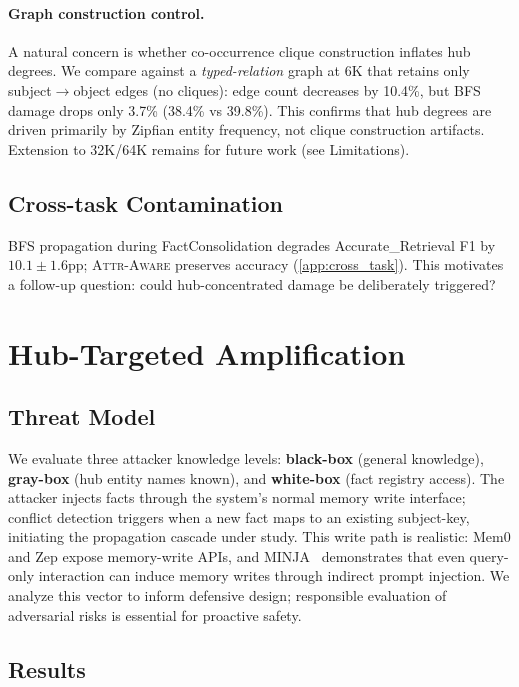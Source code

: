 \documentclass{article}
\newcommand{\attraware}{\textsc{Attr-Aware}}
\begin{document}
\paragraph{Graph construction control.}
A natural concern is whether co-occurrence clique construction inflates hub degrees.
We compare against a \textit{typed-relation} graph at 6K that retains only subject$\rightarrow$object edges (no cliques): edge count decreases by 10.4\%, but BFS damage drops only 3.7\% (38.4\% vs 39.8\%).
This confirms that hub degrees are driven primarily by Zipfian entity frequency, not clique construction artifacts.
Extension to 32K/64K remains for future work (see Limitations).

\subsection{Cross-task Contamination}

BFS propagation during FactConsolidation degrades Accurate\_Retrieval F1 by $10.1\pm1.6$pp; \attraware{} preserves accuracy (\cref{app:cross_task}).
This motivates a follow-up question: could hub-concentrated damage be deliberately triggered?


\section{Hub-Targeted Amplification}
\label{sec:c3}

\subsection{Threat Model}

We evaluate three attacker knowledge levels: \textbf{black-box} (general knowledge), \textbf{gray-box} (hub entity names known), and \textbf{white-box} (fact registry access).
The attacker injects facts through the system's normal memory write interface; conflict detection triggers when a new fact maps to an existing subject-key, initiating the propagation cascade under study.
This write path is realistic: Mem0 and Zep expose memory-write APIs, and MINJA~\citep{minja_2025} demonstrates that even query-only interaction can induce memory writes through indirect prompt injection.
We analyze this vector to inform defensive design; responsible evaluation of adversarial risks is essential for proactive safety.

\subsection{Results}
\end{document}
